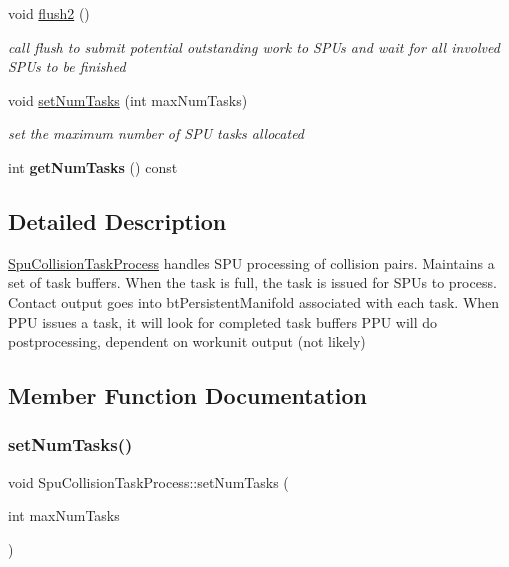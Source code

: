 \begin{DoxyCompactItemize}
void \hyperlink{classSpuCollisionTaskProcess_afdb2b028ac84b0e90286eb6d4ed10fd3}{flush2} ()
\begin{DoxyCompactList}\small\item\em call flush to submit potential outstanding work to S\+P\+Us and wait for all involved S\+P\+Us to be finished \end{DoxyCompactList}\item 
\mbox{\label{classSpuCollisionTaskProcess_aa079f41eb800756bff561982db6dab00}} 
void \hyperlink{classSpuCollisionTaskProcess_aa079f41eb800756bff561982db6dab00}{set\+Num\+Tasks} (int max\+Num\+Tasks)
\begin{DoxyCompactList}\small\item\em set the maximum number of S\+PU tasks allocated \end{DoxyCompactList}\item 
\mbox{\label{classSpuCollisionTaskProcess_abe43a4914aba6cfd93ccaf16e94f31d6}} 
int {\bfseries get\+Num\+Tasks} () const
\end{DoxyCompactItemize}


\subsection{Detailed Description}
\hyperlink{classSpuCollisionTaskProcess}{Spu\+Collision\+Task\+Process} handles S\+PU processing of collision pairs. Maintains a set of task buffers. When the task is full, the task is issued for S\+P\+Us to process. Contact output goes into bt\+Persistent\+Manifold associated with each task. When P\+PU issues a task, it will look for completed task buffers P\+PU will do postprocessing, dependent on workunit output (not likely) 

\subsection{Member Function Documentation}
\mbox{\label{classSpuCollisionTaskProcess_aa079f41eb800756bff561982db6dab00}} 
\subsubsection{\texorpdfstring{set\+Num\+Tasks()}{setNumTasks()}}
{\footnotesize\ttfamily void Spu\+Collision\+Task\+Process\+::set\+Num\+Tasks (\begin{DoxyParamCaption}\item[{int}]{max\+Num\+Tasks }\end{DoxyParamCaption})}



